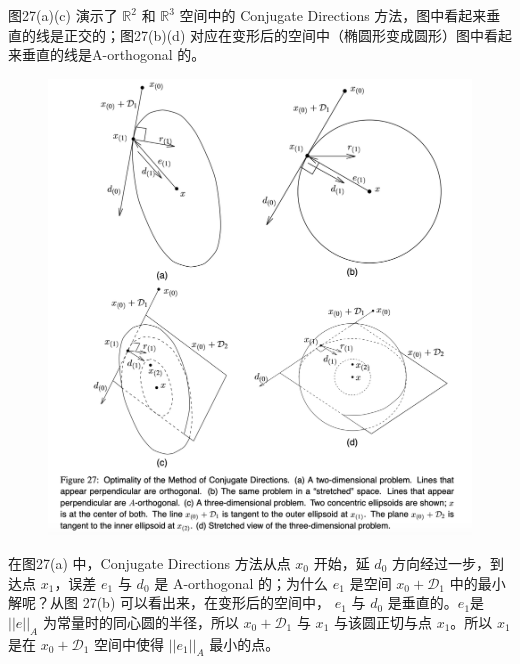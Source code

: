 \documentclass[12pt]{article}
\begin{document}
图27(a)(c) 演示了 $\mathbb{R}^2$ 和 $\mathbb{R}^3$ 空间中的 Conjugate Directions 方法，图中看起来垂直的线是正交的；图27(b)(d) 对应在变形后的空间中（椭圆形变成圆形）图中看起来垂直的线是A-orthogonal 的。
\begin{figure}[H]
    \centering
    \includegraphics[width=1\textwidth]{fig/CG_Convergence_CD_6.png}
\end{figure}

在图27(a) 中，Conjugate Directions 方法从点 $x_0$ 开始，延 $d_0$ 方向经过一步，到达点 $x_1$，误差 $e_1$ 与 $d_0$ 是 A-orthogonal 的；为什么 $e_1$ 是空间 $x_0 + \mathcal{D}_1$ 中的最小解呢？从图 27(b) 可以看出来，在变形后的空间中， $e_1$ 与 $d_0$ 是垂直的。$e_1$是 $||e||_A$ 为常量时的同心圆的半径，所以 $x_0 + \mathcal{D}_1$ 与 $x_1$ 与该圆正切与点 $x_1$。所以 $x_1$ 是在 $x_0 + \mathcal{D}_1$ 空间中使得 $||e_1||_A$ 最小的点。



\end{document}
